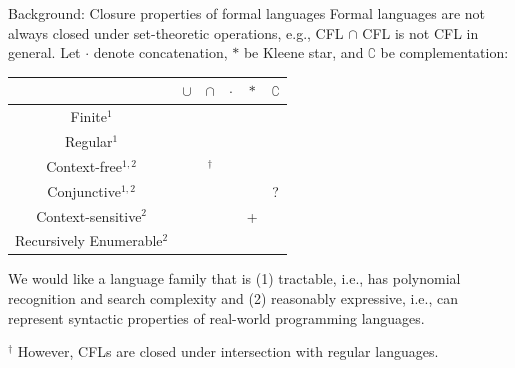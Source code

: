 \documentclass{beamer}
\newcommand{\cmark}{\ding{51}}%
\newcommand{\xmark}{\ding{55}}%
\begin{document}
\begin{frame}[fragile]{Background: Closure properties of formal languages}
  Formal languages are not always closed under set-theoretic operations, e.g., CFL $\cap$ CFL is not CFL in general. Let $\cdot$ denote concatenation, $*$ be Kleene star, and $\complement$ be complementation:\\
  \begin{table}
    \begin{tabular}{c|ccccc}
      & $\cup$ & $\cap$ & $\cdot$ & $*$ & $\complement$ \\\hline
      Finite$^1$                                  & \cmark & \cmark     & \cmark  & \cmark  & \cmark \\
      Regular$^1$                                 & \cmark & \cmark     & \cmark  & \cmark  & \cmark \\
      \rowcolor{slightgray} Context-free$^{1, 2}$ & \cmark & \xmark$^\dagger$ & \cmark  & \cmark  & \xmark \\
      Conjunctive$^{1,2}$                         & \cmark & \cmark     & \cmark  & \cmark  & ?      \\
      Context-sensitive$^2$                       & \cmark & \cmark     & \cmark  & +       & \cmark \\
      Recursively Enumerable$^2$                  & \cmark & \cmark     & \cmark  & \cmark  & \xmark \\
    \end{tabular}
  \end{table}
  We would like a language family that is (1) tractable, i.e., has polynomial recognition and search complexity and (2) reasonably expressive, i.e., can represent syntactic properties of real-world programming languages.\vspace{0.2cm}

  $^\dagger$ However, CFLs are closed under intersection with regular languages.
\end{frame}
\end{document}
